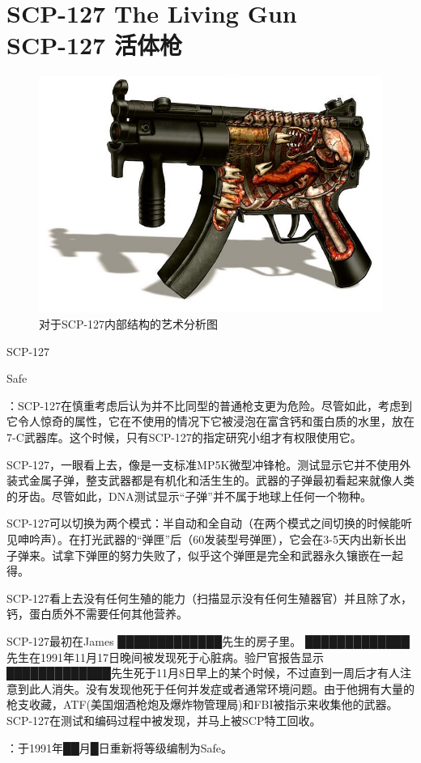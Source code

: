 \chapter[SCP-127 活体枪]{
    SCP-127 The Living Gun\\
    SCP-127 活体枪
}

\label{chap:SCP-127}

\begin{figure}[H]
    \centering
    \includegraphics[width=0.5\linewidth]{images/SCP-127.jpg}
    \caption*{对于SCP-127内部结构的艺术分析图}
\end{figure}

SCP-127

Safe

：SCP-127在慎重考虑后认为并不比同型的普通枪支更为危险。尽管如此，考虑到它令人惊奇的属性，它在不使用的情况下它被浸泡在富含钙和蛋白质的水里，放在7-C武器库。这个时候，只有SCP-127的指定研究小组才有权限使用它。

SCP-127，一眼看上去，像是一支标准MP5K微型冲锋枪。测试显示它并不使用外装式金属子弹，整支武器都是有机化和活生生的。武器的子弹最初看起来就像人类的牙齿。尽管如此，DNA测试显示“子弹”并不属于地球上任何一个物种。

SCP-127可以切换为两个模式：半自动和全自动（在两个模式之间切换的时候能听见呻吟声）。在打光武器的“弹匣”后（60发装型号弹匣），它会在3-5天内出新长出子弹来。试拿下弹匣的努力失败了，似乎这个弹匣是完全和武器永久镶嵌在一起得。

SCP-127看上去没有任何生殖的能力（扫描显示没有任何生殖器官）并且除了水，钙，蛋白质外不需要任何其他营养。

SCP-127最初在James █████████████先生的房子里。 █████████████先生在1991年11月17日晚间被发现死于心脏病。验尸官报告显示 █████████████先生死于11月8日早上的某个时候，不过直到一周后才有人注意到此人消失。没有发现他死于任何并发症或者通常环境问题。由于他拥有大量的枪支收藏，ATF(美国烟酒枪炮及爆炸物管理局)和FBI被指示来收集他的武器。SCP-127在测试和编码过程中被发现，并马上被SCP特工回收。

：于1991年██月█日重新将等级编制为Safe。
